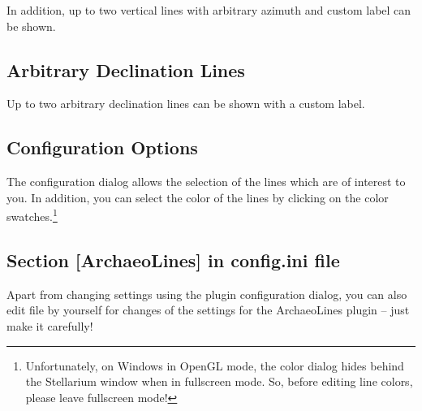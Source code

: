 In addition, up to two vertical lines with arbitrary azimuth and
custom label can be shown.


\subsection{Arbitrary Declination Lines}
\label{sec:plugin:ArchaeoLines:Declinations}

Up to two arbitrary declination lines can be shown with a custom label. 

\subsection{Configuration Options}
\label{sec:plugin:ArchaeoLines:configuration}

The configuration dialog allows the selection of the lines which are
of interest to you. 
%
%
In addition, you can select the color of the lines by clicking on the
color swatches.\footnote{Unfortunately, on Windows in OpenGL mode, the color dialog hides
behind the Stellarium window when in fullscreen mode. So, before
editing line colors, please leave fullscreen mode!}

\subsection*{Section [ArchaeoLines] in config.ini file}

Apart from changing settings using the plugin configuration dialog,
you can also edit  file by yourself for changes of the
settings for the ArchaeoLines plugin -- just make it carefully!

